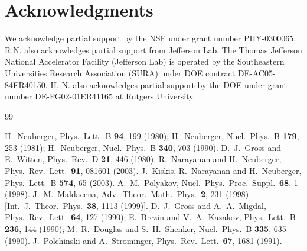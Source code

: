 \section*{Acknowledgments}

We acknowledge partial support by the NSF under
grant number PHY-0300065.
R.N. also acknowledges partial support from Jefferson
Lab. The Thomas Jefferson National Accelerator Facility
(Jefferson Lab) is operated by the Southeastern Universities Research
Association (SURA) under DOE contract DE-AC05-84ER40150.
H. N. also acknowledges partial support
by the DOE under grant number
DE-FG02-01ER41165 at Rutgers University.

\begin{thebibliography}{99}

H.~Neuberger,
  Phys.\ Lett.\ B {\bf 94}, 199 (1980);
H.~Neuberger,
  Nucl.\ Phys.\ B {\bf 179}, 253 (1981);
  H.~Neuberger,
  Nucl.\ Phys.\ B {\bf 340}, 703 (1990).
D.~J.~Gross and E.~Witten,
  Phys.\ Rev.\ D {\bf 21}, 446 (1980).
R.~Narayanan and H.~Neuberger,
  Phys.\ Rev.\ Lett.\  {\bf 91}, 081601 (2003).
J.~Kiskis, R.~Narayanan and H.~Neuberger,
  Phys.\ Lett.\ B {\bf 574}, 65 (2003).
A.~M.~Polyakov,
  Nucl.\ Phys.\ Proc.\ Suppl.\  {\bf 68}, 1 (1998).
J.~M.~Maldacena,
  Adv.\ Theor.\ Math.\ Phys.\  {\bf 2}, 231 (1998)
  [Int.\ J.\ Theor.\ Phys.\  {\bf 38}, 1113 (1999)].
D.~J.~Gross and A.~A.~Migdal,
  Phys.\ Rev.\ Lett.\  {\bf 64}, 127 (1990);
E.~Brezin and V.~A.~Kazakov,
  Phys.\ Lett.\ B {\bf 236}, 144 (1990);
  M.~R.~Douglas and S.~H.~Shenker,
  Nucl.\ Phys.\ B {\bf 335}, 635 (1990).
 J.~Polchinski and A.~Strominger,
  Phys.\ Rev.\ Lett.\  {\bf 67}, 1681 (1991).

\end{thebibliography}
